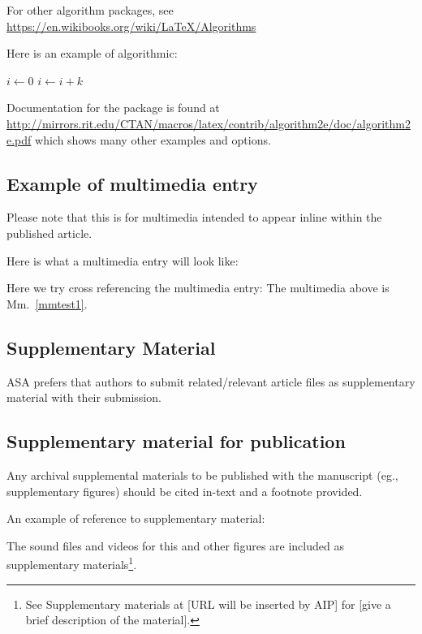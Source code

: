 \documentclass[preprint]{JASA}
\begin{document}
For other algorithm packages, see
\url{https://en.wikibooks.org/wiki/LaTeX/Algorithms}

Here is an example of algorithmic:


\begin{algorithmic}
    \State $i\gets 0$
\Else
        \State $i\gets i+k$
    \EndIf
\EndIf
\end{algorithmic}

Documentation for the package is found at 
\url{http://mirrors.rit.edu/CTAN/macros/latex/contrib/algorithm2e/doc/algorithm2e.pdf}
which shows many other examples and options.

\newpage
\subsection{Example of multimedia entry}
Please note that this is for multimedia intended to appear inline
within the published article. 

Here is what a multimedia entry will look like:
\label{mmtest1}

Here we try cross referencing the multimedia entry: The multimedia
above is Mm.~\ref{mmtest1}.

\subsection{Supplementary Material}
ASA
prefers that authors to submit related/relevant article files as
supplementary material with their submission.

\subsection{Supplementary material for publication}
Any archival supplemental materials to be published with the
manuscript (eg., supplementary figures) should be cited in-text and a footnote provided.

An example of reference to supplementary material:

The sound files and videos for this and other figures
are included as supplementary materials\footnote{See
Supplementary materials at [URL will be inserted by AIP]
for [give a brief description of the material].}.
\end{document}
